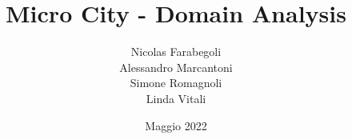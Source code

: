 \title{Micro City - Domain Analysis}
\author{Nicolas Farabegoli\\
Alessandro Marcantoni\\
Simone Romagnoli\\
Linda Vitali}
\date{Maggio 2022}
